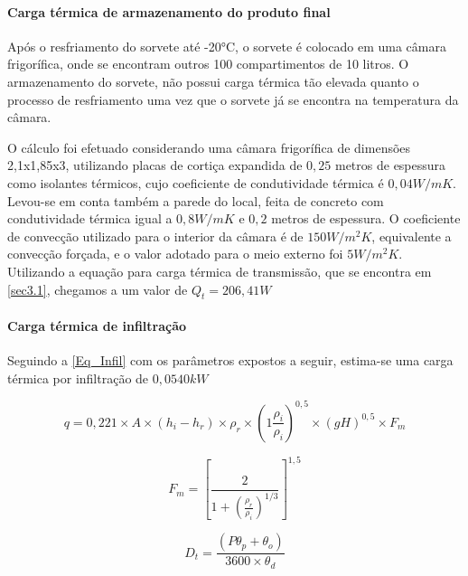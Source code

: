 \documentclass[10pt,a4paper]{article}
\begin{document}
\paragraph*{{ Carga térmica de armazenamento do produto final}} 
Após o resfriamento do sorvete até -20°C, o sorvete é colocado em uma câmara frigorífica, onde se encontram outros 100 compartimentos de 10 litros. O armazenamento do sorvete, não possui carga térmica tão elevada quanto o processo de resfriamento uma vez que o sorvete já se encontra na temperatura da câmara.

O cálculo foi efetuado considerando uma câmara frigorífica de dimensões 2,1x1,85x3, utilizando placas de cortiça expandida de $0,25$ metros de espessura como isolantes térmicos, cujo coeficiente de condutividade térmica é $0,04 {W}/{mK}$. Levou-se em conta também a parede do local, feita de concreto com condutividade térmica igual a $0,8 {W}/{mK}$ e $0,2$ metros de espessura. O coeficiente de convecção utilizado para o interior da câmara é de $150 {W}/{m^{2}K}$, equivalente a convecção forçada, e o valor adotado para o meio externo foi $5 {W}/{m^{2}K}$.
Utilizando a equação para carga térmica de transmissão, que se encontra em \ref{sec3.1}, chegamos a um valor de $Q_t = 206,41 W$

\paragraph*{{ Carga térmica de infiltração}}

Seguindo a \ref{Eq_Infil} com os parâmetros expostos a seguir, estima-se uma carga térmica por infiltração de $0,0540 kW$ 

\begin{equation}
    q = 0,221 \times A \times (h_{i}-h_{r}) \times \rho_{r} \times (1\frac{\rho_{i}}{\rho_{i}})^{0,5} \times (gH)^{0,5} \times F_{m}
\end{equation}

\begin{equation}
    F_{m} = \left [ \frac{2}{1+\left ( \frac{\rho_{r}}{\rho_{i}} \right )^{1/3}} \right ]^{1,5}
\end{equation}

\begin{equation}
    D_{t} = \frac{(P\theta_{p}+\theta_{o})}{3600 \times \theta_{d}}
\end{equation}
\end{document}
